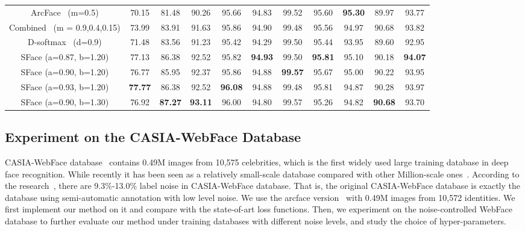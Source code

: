 \documentclass[journal,comsoc]{IEEEtran}
\begin{document}
\begin{table*}
\begin{center}
{\begin{tabular}{|c|c|c|c|c|c|c|c|c|c|c|}
				ArcFace~\cite{deng2019arcface} (m=0.5)&70.15&81.48&90.26&95.66
				&94.83&99.52&95.60&\bf{95.30}&89.97&93.77\\ 
				Combined~\cite{deng2019arcface} (m = 0.9,0.4,0.15)&73.99&83.91&91.63&95.86
				&94.90&99.48&95.56&94.97&90.68&93.82\\ 
				D-softmax~\cite{he2019softmax} (d=0.9)&71.48&83.56&91.23&95.42
				&94.29&99.50&95.44&93.95&89.60&92.95\\ \hline\hline
				SFace (a=0.87, b=1.20)&77.13&86.38&92.52&95.82
				&\bf{94.93}&99.50&\bf{95.81}&95.10&90.18&\bf{94.07}\\
				SFace (a=0.90, b=1.20)
				&76.77&85.95&92.37&95.86
				&94.88&\bf{99.57}&95.67&95.00&90.22&93.95\\ 
				SFace (a=0.93, b=1.20)
				&\bf{77.77}&86.38&92.52&\bf{96.08}
				&94.88&99.48&95.81&94.87&90.28&93.97\\ 			
				SFace (a=0.90, b=1.30)&76.92&\bf{87.27}&\bf{93.11}&96.00&94.80
				&99.57&95.26&94.82&\bf{90.68}&93.70\\ \hline				
			\end{tabular}
		}
	\end{center}
	
\end{table*}

\subsection{Experiment on the CASIA-WebFace Database}
CASIA-WebFace database~\cite{Yi2014CASIA} contains 0.49M images from 10,575 celebrities, which is the first widely used large training database in deep face recognition. While recently it has been seen as a relatively small-scale database compared with other Million-scale ones~\cite{guo2016msceleb,Cao18}. According to the research~\cite{wang2018devil}, there are 9.3\%-13.0\% label noise in CASIA-WebFace database. That is, the original CASIA-WebFace database is exactly the database using semi-automatic annotation with low level noise. We use the arcface version~\cite{deng2019arcface} with 0.49M images from 10,572 identities. We first implement our method on it and compare with the state-of-art loss functions. Then, we experiment on the noise-controlled WebFace database to further evaluate our method under training databases with different noise levels, and study the choice of hyper-parameters.
\end{document}

